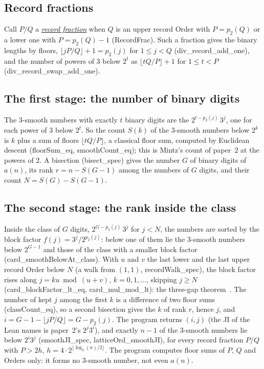 \documentclass[10pt,a4paper,titlepage]{article}
\makeatletter
\newcommand{\termhere}[1]{\leavevmode
  \Hy@raisedlink{\hyper@anchorstart{term:#1}\hyper@anchorend}}
\newcommand{\keyterm}[2]{\hyperlink{box:#1}{\emph{#2}}}
\newcommand{\keysym}[2]{\hyperlink{box:#1}{#2}}
\newcommand{\lean}[1]{\textsf{#1}}
\makeatother
\begin{document}
\subsection*{Record fractions}

\termhere{recordfrac}Call $P/Q$ a \keyterm{recordfrac}{record fraction} when $Q$ is an upper record Order with $P = p_2(Q)$ or a
lower one with $P = p_2(Q) - 1$ (\lean{RecordFrac}). Such a fraction gives the binary lengths
by floors, $\lfloor jP/Q \rfloor + 1 = p_2(j)$ for $1 \le j < Q$
(\lean{div\_record\_add\_one}), and the number of powers of $3$ below $2^t$ as
$\lfloor tQ/P \rfloor + 1$ for $1 \le t < P$ (\lean{div\_record\_swap\_add\_one}).

\subsection*{The first stage: the number of binary digits}

\termhere{S}The $3$-smooth numbers with exactly $t$ binary digits are the $2^{t - p_2(j)}\,3^j$, one for
each power of $3$ below $2^t$. So the count \keysym{S}{$S(k)$} of the $3$-smooth numbers below $2^k$ is
$k$ plus a sum of floors $\lfloor tQ/P \rfloor$, a classical floor sum, computed by
Euclidean descent (\lean{floorSum\_eq}, \lean{smoothCount\_eq}); this is Mintz's count of
paper~2 at the powers of $2$. A bisection (\lean{bisect\_spec}) gives the number $G$ of
binary digits of $a(n)$, its rank $r = n - S(G-1)$ among the numbers of $G$ digits, and
their count $N = S(G) - S(G-1)$.

\subsection*{The second stage: the rank inside the class}

Inside the class of $G$ digits, $2^{G - p_2(j)}\,3^j$ for $j < N$, the numbers are sorted by
the block factor $f(j) = 3^j/2^{p_2(j)}$: below one of them lie the $3$-smooth numbers below
$2^{G-1}$ and those of the class with a smaller block factor
(\lean{card\_smoothBelowAt\_class}). With $u$ and $v$ the last lower and the last upper
record Order below $N$ (a walk from $(1, 1)$, \lean{recordWalk\_spec}), the block factor
rises along $j = k u \bmod (u + v)$, $k = 0, 1, \dots$, skipping $j \ge N$
(\lean{card\_blockFactor\_lt\_eq}, \lean{card\_mul\_mod\_lt}): the three-gap theorem~\cite{Sos1958,Swierczkowski1958}. The
number of kept $j$ among the first $k$ is a difference of two floor sums
(\lean{classCount\_eq}), so a second bisection gives the $k$ of rank $r$, hence $j$, and
$i = G - 1 - \lfloor jP/Q \rfloor = G - p_2(j)$. The program returns $(i, j)$ (the \textsf{JI} of the Lean names is paper~2's $2^j 3^i$), and exactly
$n - 1$ of the $3$-smooth numbers lie below $2^i 3^j$ (\lean{smoothJI\_spec},
\lean{latticeOrd\_smoothJI}), for every record fraction $P/Q$ with $P > 2h$,
$h = 4 \cdot 2^{\lfloor \log_2(n)/2 \rfloor}$. The program computes floor sums of $P$, $Q$ and
Orders only: it forms no $3$-smooth number, not even $a(n)$.
\end{document}
